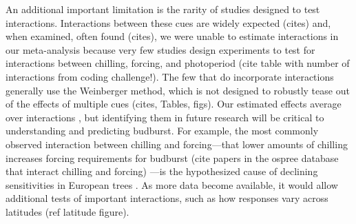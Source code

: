 \documentclass{article}
\begin{document}

\par An additional important limitation is the rarity of studies designed to test interactions. Interactions between these cues are widely expected (cites) and, when examined, often found (cites), we were unable to estimate interactions in our meta-analysis because very few studies design experiments to test for interactions between chilling, forcing, and photoperiod (cite table with number of interactions from coding challenge!). The few that do incorporate interactions generally use the Weinberger method, which is not designed to robustly tease out of the effects of multiple cues (cites, Tables, figs).  Our estimated effects average over interactions \citep{gelman2006}, but identifying them in future research will be critical to understanding and predicting budburst. For example, the most commonly observed interaction between chilling and forcing---that lower amounts of chilling increases forcing requirements for budburst %
(cite papers in the ospree database that interact chilling and forcing)
---is the hypothesized cause of declining sensitivities in European trees \citep{fu2015,vitasse}. As more data become available, it would allow additional tests of important interactions, such as how responses vary across latitudes (ref latitude figure). %
\end{document}
